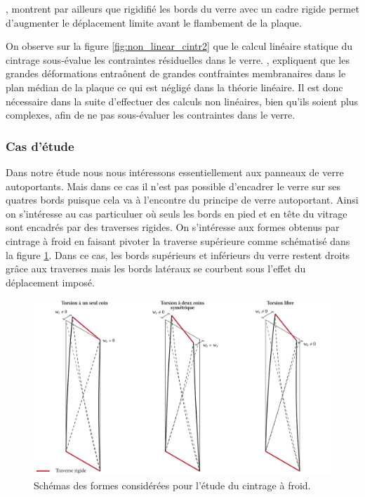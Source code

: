 \documentclass[11pt,titlepage]{article}
\begin{document}
\Textcite{buckling_cold}, montrent par ailleurs que rigidifié les bords du verre avec un cadre rigide permet d'augmenter le déplacement limite avant le flambement de la plaque. 

On observe sur la figure \ref{fig:non_linear_cintr2} que le calcul linéaire statique du cintrage sous-évalue les contraintes résiduelles dans le verre. \Textcite{buckling_cold}, expliquent que les grandes déformations entraônent de grandes contfraintes membranaires dans le plan médian de la plaque ce qui est négligé dans la théorie linéaire. Il est donc nécessaire dans la suite d'effectuer des calculs non linéaires, bien qu'ils soient plus complexes, afin de ne pas sous-évaluer les contraintes dans le verre. 

\subsubsection{Cas d'étude}

Dans notre étude nous nous intéressons essentiellement aux panneaux de verre autoportants. Mais dans ce cas il n'est pas possible d'encadrer le verre sur ses quatres bords puisque cela va à l'encontre du principe de verre autoportant. Ainsi on s'intéresse au cas particuluer où seuls les bords en pied et en tête du vitrage sont encadrés par des traverses rigides. On s'intéresse aux formes obtenus par cintrage à froid en faisant pivoter la traverse supérieure comme schématisé dans la figure \ref{fig:forme_cintr}. Dans ce cas, les bords supérieurs et inférieurs du verre restent droits grâce aux traverses mais les bords latéraux se courbent sous l'effet du déplacement imposé.

\begin{figure}[H]
    \includegraphics[width=\linewidth]{img/cintrage_froid/def.pdf}
       \caption{Schémas des formes considérées pour l'étude du cintrage à froid.}
   \label{fig:forme_cintr}
   \end{figure}
\end{document}
